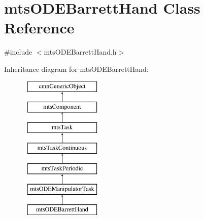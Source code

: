 \hypertarget{classmts_o_d_e_barrett_hand}{\section{mts\-O\-D\-E\-Barrett\-Hand Class Reference}
\label{classmts_o_d_e_barrett_hand}
}


{\ttfamily \#include $<$mts\-O\-D\-E\-Barrett\-Hand.\-h$>$}

Inheritance diagram for mts\-O\-D\-E\-Barrett\-Hand\-:\begin{figure}[H]
\begin{center}
\leavevmode
\includegraphics[height=7.000000cm]{d1/da1/classmts_o_d_e_barrett_hand}
\end{center}
\end{figure}
